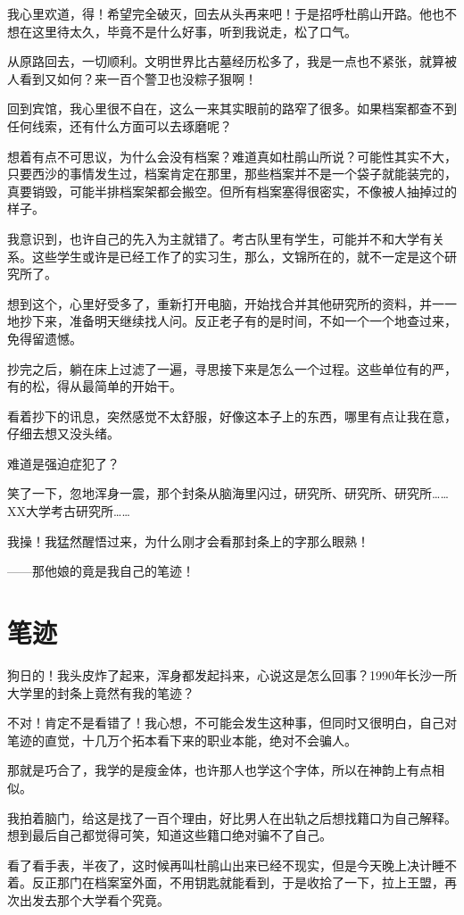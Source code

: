 我心里欢道，得！希望完全破灭，回去从头再来吧！于是招呼杜鹃山开路。他也不想在这里待太久，毕竟不是什么好事，听到我说走，松了口气。

从原路回去，一切顺利。文明世界比古墓经历松多了，我是一点也不紧张，就算被人看到又如何？来一百个警卫也没粽子狠啊！

回到宾馆，我心里很不自在，这么一来其实眼前的路窄了很多。如果档案都查不到任何线索，还有什么方面可以去琢磨呢？

想着有点不可思议，为什么会没有档案？难道真如杜鹃山所说？可能性其实不大，只要西沙的事情发生过，档案肯定在那里，那些档案并不是一个袋子就能装完的，真要销毁，可能半排档案架都会搬空。但所有档案塞得很密实，不像被人抽掉过的样子。

我意识到，也许自己的先入为主就错了。考古队里有学生，可能并不和大学有关系。这些学生或许是已经工作了的实习生，那么，文锦所在的，就不一定是这个研究所了。

想到这个，心里好受多了，重新打开电脑，开始找合并其他研究所的资料，并一一地抄下来，准备明天继续找人问。反正老子有的是时间，不如一个一个地查过来，免得留遗憾。

抄完之后，躺在床上过滤了一遍，寻思接下来是怎么一个过程。这些单位有的严，有的松，得从最简单的开始干。

看着抄下的讯息，突然感觉不太舒服，好像这本子上的东西，哪里有点让我在意，仔细去想又没头绪。

难道是强迫症犯了？

笑了一下，忽地浑身一震，那个封条从脑海里闪过，研究所、研究所、研究所……XX大学考古研究所……

我操！我猛然醒悟过来，为什么刚才会看那封条上的字那么眼熟！

——那他娘的竟是我自己的笔迹！

\chapter{笔迹}

狗日的！我头皮炸了起来，浑身都发起抖来，心说这是怎么回事？1990年长沙一所大学里的封条上竟然有我的笔迹？

不对！肯定不是看错了！我心想，不可能会发生这种事，但同时又很明白，自己对笔迹的直觉，十几万个拓本看下来的职业本能，绝对不会骗人。

那就是巧合了，我学的是瘦金体，也许那人也学这个字体，所以在神韵上有点相似。

我拍着脑门，给这是找了一百个理由，好比男人在出轨之后想找籍口为自己解释。想到最后自己都觉得可笑，知道这些籍口绝对骗不了自己。

看了看手表，半夜了，这时候再叫杜鹃山出来已经不现实，但是今天晚上决计睡不着。反正那门在档案室外面，不用钥匙就能看到，于是收拾了一下，拉上王盟，再次出发去那个大学看个究竟。


